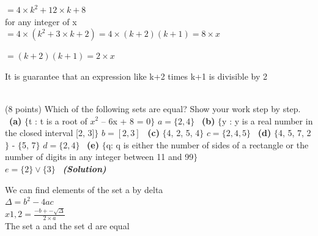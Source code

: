 \documentclass[a4 paper]{article}
\numberwithin{equation}{section}
\newcommand{\problem}[2]{~\\\fbox{\textbf{Problem #1}}\hfill (#2 points)\newline\newline}
\newcommand{\subproblem}[1]{~\newline\textbf{(#1)}}
\newcommand{\solution}{~\newline\textbf{\textit{(Solution)}} }
\newcommand{\0}{\mathbf{0}}
\begin{document}
$ =  4\times k^2 + 12\times k + 8 $ \\
\newline
for any integer of x \\
\newline
$ =  4 \times (k^2 + 3\times k + 2) = 4 \times (k+2)(k+1) = 8 \times x$ \\
\newline

$ = (k+2)(k+1) = 2 \times x $ \\
\newline

It is guarantee that an expression like k+2 times k+1 is divisible by 2





\newline
\problem{6: Sets}{8}
Which of the following sets are equal? Show your work step by step.\newline
\subproblem{a} $\{$t : t is a root of $x^2$ – 6x + 8 = 0$\}$
\newline
\newline
$ a = \{2,4\}$
\newline
\subproblem{b} $\{$y : y is a real number in the closed interval [2, 3]$\}$
\newline
\newline
$ b = [2,3]$
\newline
\subproblem{c} $\{$4, 2, 5, 4$\}$
\newline
\newline
$ c = \{2,4,5\}$
\newline
\subproblem{d} $\{$4, 5, 7, 2$\}$ - $\{$5, 7$\}$
\newline
\newline
$ d = \{2,4\}$
\newline
\subproblem{e} $\{$q: q is either the number of sides of a rectangle or the number of digits in any integer between 11 and 99$\}$\\
\newline
\newline
$ e = \{2\} \vee \{3\}$
\newline
\solution

We can find elements of the set a by delta \\

$\Delta = b^2 - 4ac$ \\
$x1,2 = \frac{-b +- \sqrt{\Delta}}{2\times a}$ \\

The set a and the set d are equal
\end{document}
